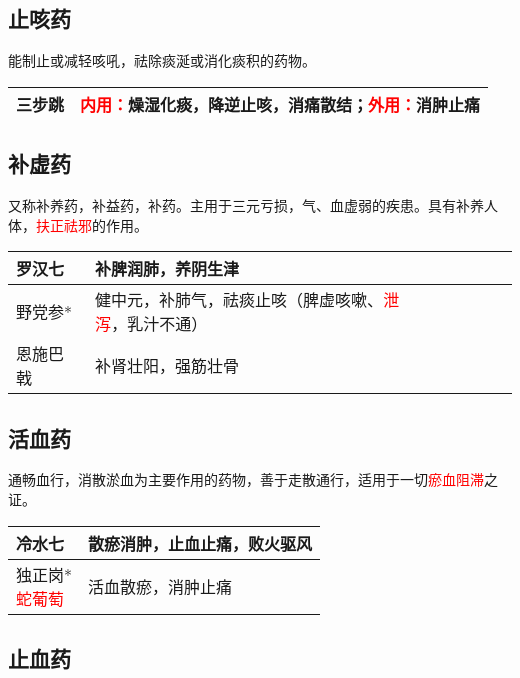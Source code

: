 \documentclass[cn,blue,12pt,normal,founder]{elegantnote}
\newcommand{\redt}[1]{\textcolor{red}{{}#1}}      %
\begin{document}
\subsection{止咳药}

能制止或减轻咳吼，祛除痰涎或消化痰积的药物。

\begin{table}[H]
  \begin{tabular}{|l|l|}
  \hline
  三步跳 & \redt{内用：}燥湿化痰，降逆止咳，消痛散结；\redt{外用：}消肿止痛     \\ \hline
  \end{tabular}
\end{table}

\subsection{补虚药}

又称补养药，补益药，补药。主用于三元亏损，气、血虚弱的疾患。具有补养人体，\redt{扶正祛邪}的作用。

\begin{table}[H]
  \begin{tabular}{|l|l|}
  \hline
  罗汉七 & 补脾润肺，养阴生津 \\ \hline
  野党参* & 健中元，补肺气，祛痰止咳（脾虚咳嗽、\redt{泄泻}，乳汁不通）  \\  \hline
  恩施巴戟 & 补肾壮阳，强筋壮骨 \\ \hline
  \end{tabular}
\end{table}

\subsection{活血药}

通畅血行，消散淤血为主要作用的药物，善于走散通行，适用于一切\redt{瘀血阻滞}之证。

\begin{table}[H]
  \begin{tabular}{|l|l|}
  \hline
  冷水七 & 散瘀消肿，止血止痛，败火驱风 \\ \hline
  \makecell[l]{独正岗* \\ \redt{蛇葡萄}} & 活血散瘀，消肿止痛  \\  \hline
  \end{tabular}
\end{table}

\subsection{止血药}
\end{document}
